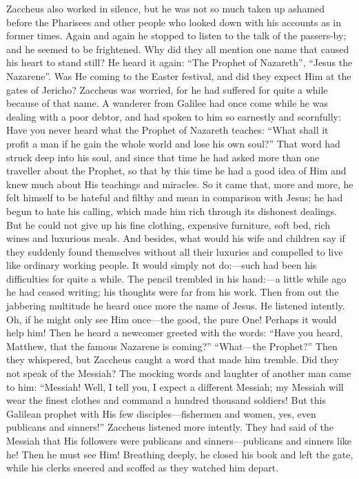 Zaccheus also worked in silence, but he was not so much taken up ashamed before the Pharisees and other people who looked down with his accounts as in former times. Again and again he stopped to listen to the talk of the passers-by; and he seemed to be frightened. Why did they all mention one name that caused his heart to stand still? He heard it again: “The Prophet of Nazareth”, “Jesus the Nazarene”. Was He coming to the Easter festival, and did they expect Him at the gates of Jericho? Zaccheus was worried, for he had suffered for quite a while because of that name. A wanderer from Galilee had once come while he was dealing with a poor debtor, and had spoken to him so earnestly and scornfully: Have you never heard what the Prophet of Nazareth teaches: “What shall it profit a man if he gain the whole world and lose his own soul?” That
word had struck deep into his soul, and since that time he had asked more than one traveller about the Prophet, so that by this time he had a good idea of Him and knew much about His teachings and miracles. So it came that, more and more, he felt himself to be hateful and filthy and mean in comparison with Jesus; he had begun to hate his calling, which made him rich through its dishonest dealings. But he could not give up his fine clothing, expensive furniture, soft bed, rich wines and luxurious meals. And besides, what would his wife and children say if they suddenly found themselves without all their luxuries and compelled to live like ordinary working people. It would simply not do:—such had been his difficulties for quite a while. The pencil trembled in his hand:—a little while ago he had ceased writing; his thoughts were far from his work. Then from out the jabbering multitude he heard once more the name of Jesus. He listened intently. Oh, if he might only see Him once—the good, the pure One! Perhaps it would help him! Then he heard a newcomer greeted with the words: “Have you heard, Matthew, that the famous Nazarene is coming?” “What—the Prophet?” Then they whispered, but Zaccheus caught a word that made him tremble. Did they not speak of the Messiah? The mocking words and laughter of another man came to him: “Messiah! Well, I tell you, I expect a different Messiah; my Messiah will wear the finest clothes and command a hundred thousand soldiers! But this Galilean prophet with His few disciples—fishermen and women, yes, even publicans and sinners!” Zaccheus listened more intently. They had said of the Messiah that His followers were publicans and sinners—publicans and sinners like he! Then he must see Him! Breathing deeply, he closed his book and left the gate, while his clerks sneered and scoffed as they watched him depart.


